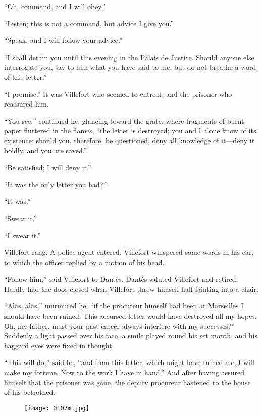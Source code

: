 “Oh, command, and I will obey.”

“Listen; this is not a command, but advice I give you.”

“Speak, and I will follow your advice.”

“I shall detain you until this evening in the Palais de Justice. Should
anyone else interrogate you, say to him what you have said to me, but
do not breathe a word of this letter.”

“I promise.” It was Villefort who seemed to entreat, and the prisoner
who reassured him.

“You see,” continued he, glancing toward the grate, where fragments of
burnt paper fluttered in the flames, “the letter is destroyed; you and
I alone know of its existence; should you, therefore, be questioned,
deny all knowledge of it—deny it boldly, and you are saved.”

“Be satisfied; I will deny it.”

“It was the only letter you had?”

“It was.”

“Swear it.”

“I swear it.”

Villefort rang. A police agent entered. Villefort whispered some words
in his ear, to which the officer replied by a motion of his head.

“Follow him,” said Villefort to Dantès. Dantès saluted Villefort and
retired. Hardly had the door closed when Villefort threw himself
half-fainting into a chair.

“Alas, alas,” murmured he, “if the procureur himself had been at
Marseilles I should have been ruined. This accursed letter would have
destroyed all my hopes. Oh, my father, must your past career always
interfere with my successes?” Suddenly a light passed over his face, a
smile played round his set mouth, and his haggard eyes were fixed in
thought.

“This will do,” said he, “and from this letter, which might have ruined
me, I will make my fortune. Now to the work I have in hand.” And after
having assured himself that the prisoner was gone, the deputy procureur
hastened to the house of his betrothed.

\begin{figure}[h]
\texttt{[image: 0107m.jpg]}
\end{figure}
